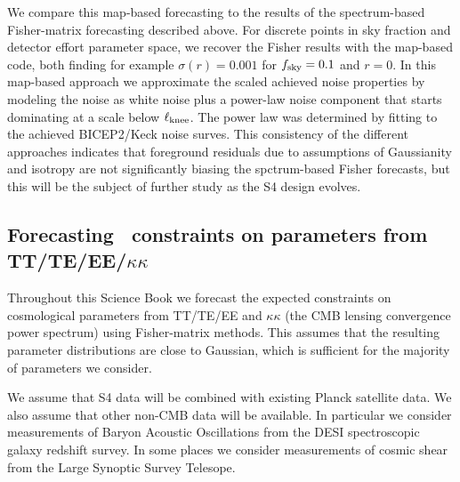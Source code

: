 We compare this map-based forecasting to the results of the spectrum-based Fisher-matrix 
forecasting described above. For discrete points in sky fraction and detector effort parameter space, 
we recover the Fisher results with the map-based code, both finding for example $\sigma(r)=0.001$ for $f_{\rm sky}=0.1$ and $r=0$. In this map-based approach we approximate the scaled achieved noise properties by modeling the noise as white noise plus a power-law noise component that starts dominating at a scale below $\ell_{\rm knee}$. The power law was determined by fitting to the achieved BICEP2/Keck noise surves.  This consistency of the different approaches indicates that foreground residuals due to assumptions of Gaussianity and isotropy are not significantly biasing the spctrum-based Fisher forecasts, but this will be the subject of further study as the S4 design evolves.

\subsection{Forecasting \cmbexp\ constraints on parameters from TT/TE/EE/$\kappa\kappa$}
\label{sec:ttee}

Throughout this Science Book we forecast the expected constraints on cosmological parameters from TT/TE/EE and $\kappa\kappa$ (the CMB lensing convergence power spectrum) using Fisher-matrix methods. This assumes that the resulting parameter distributions are close to Gaussian, which is sufficient for the majority of parameters we consider.

We assume that S4 data will be combined with existing Planck satellite data. We also assume that other non-CMB data will be available. In particular we consider measurements of Baryon Acoustic Oscillations from the DESI spectroscopic galaxy redshift survey. In some places we consider measurements of cosmic shear from the Large Synoptic Survey Telesope.


